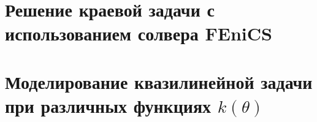 \chapter{Решение краевой задачи с использованием солвера FEniCS}
\label{ch:ch5a}

\begingroup
\captiondelim{ } %

\endgroup


\chapter{Моделирование квазилинейной задачи при различных функциях $k(\theta)$}
\label{ch:ch5b}
\begingroup
\captiondelim{ } %

\endgroup
